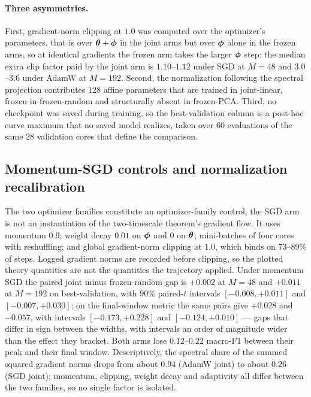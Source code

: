 \paragraph{Three asymmetries.} First, gradient-norm clipping at $1.0$ was
computed over the optimizer's parameters, that is over ${\boldsymbol{\theta}} + {\boldsymbol{\phi}}$ in the
joint arms but over ${\boldsymbol{\phi}}$ alone in the frozen arms, so at identical gradients
the frozen arm takes the larger ${\boldsymbol{\phi}}$ step: the median extra clip factor paid
by the joint arm is $1.10$--$1.12$ under SGD at $M = 48$ and $3.0$--$3.6$ under
AdamW at $M = 192$. Second, the normalization following the spectral projection
contributes $128$ affine parameters that are trained in joint-linear, frozen in
frozen-random and structurally absent in frozen-PCA. Third, no checkpoint was
saved during training, so the best-validation column is a post-hoc curve
maximum that no saved model realizes, taken over $60$ evaluations of the same
$28$ validation cores that define the comparison.

\subsection{Momentum-SGD controls and normalization recalibration}
\label{app:prod_sgd}

The two optimizer families constitute an optimizer-family control; the SGD arm
is not an instantiation of the two-timescale theorem's gradient flow. It uses
momentum $0.9$; weight decay $0.01$ on ${\boldsymbol{\phi}}$ and $0$ on ${\boldsymbol{\theta}}$;
mini-batches of four cores with reshuffling; and global gradient-norm clipping
at $1.0$, which binds on $73$--$89\%$ of steps. Logged gradient norms are
recorded before clipping, so the plotted theory quantities are not the
quantities the trajectory applied. Under momentum SGD the paired joint minus
frozen-random gap is $+0.002$ at $M = 48$ and $+0.011$ at $M = 192$ on
best-validation, with $90\%$ paired-$t$ intervals $[-0.008, +0.011]$ and
$[-0.007, +0.030]$; on the final-window metric the same pairs give $+0.028$ and
$-0.057$, with intervals $[-0.173, +0.228]$ and $[-0.124, +0.010]$ --- gaps
that differ in sign between the widths, with intervals an order of magnitude
wider than the effect they bracket. Both arms lose $0.12$--$0.22$ macro-F1
between their peak and their final window. Descriptively, the spectral share of
the summed squared gradient norms drops from about $0.94$ (AdamW joint) to
about $0.26$ (SGD joint); momentum, clipping, weight decay and adaptivity all
differ between the two families, so no single factor is isolated.

